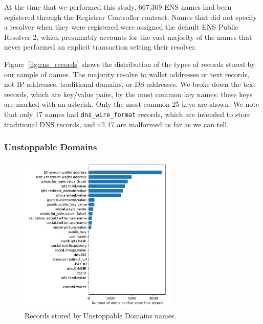 At the time that we performed this study, 667,369 ENS names had been 
registered through the Registrar Controller contract. Names that did not 
specify a resolver when they were registered 
were assigned the default ENS Public Resolver 2, which presumably accounts for 
the vast majority of the names that never performed an explicit transaction 
setting their resolver.  

Figure~\ref{fig:ens_records} shows the distribution of the types of records 
stored by our sample of names. The majority resolve to wallet addresses or text 
records, not IP addresses, traditional domains, or DS addresses. We broke down 
the text records, which are key/value pairs, by the most common key names: 
these keys are marked with an asterisk. Only the most common 25 keys are shown. 
We note that only 17 names had \texttt{dns\_wire\_format} records, which are 
intended to store traditional DNS 
records, and all 17 are malformed as far as we can tell. 

%

\subsubsection{Unstoppable Domains}

\begin{figure}[t]
	\centering
	\includegraphics[width=3in]{figs/all_unstoppable_records.pdf}
	\caption{Records stored by Unstoppable Domains names.}
	\label{fig:unstoppable_records}
\end{figure}

